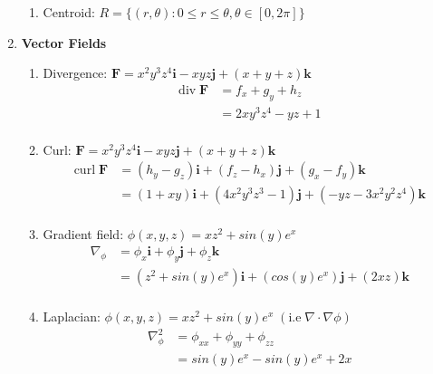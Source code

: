 \documentclass[11pt]{article}
\begin{document}
\begin{preview}
\begin{enumerate}
\begin{enumerate}
            \item Centroid: $R = \{ (r, \theta) : 0 \le r \le \theta, \theta \in [0, 2\pi] \}$
          \end{enumerate}
    \item \textbf{Vector Fields}
          \begin{enumerate}
            \item Divergence: $\textbf{F}=x^{2}y^{3}z^{4}\textbf{i} - xyz\textbf{j} + (x+y+z)\textbf{k}$
                  \begin{align*}
                    \mathrm{div} \; \textbf{F} & = f_{x} + g_{y} + h_{z} \\
                                               & = 2xy^{3}z^{4} -yz + 1  \\
                  \end{align*}
            \item Curl: $\textbf{F}=x^{2}y^{3}z^{4}\textbf{i} - xyz\textbf{j} + (x+y+z)\textbf{k}$
                  \begin{align*}
                    \mathrm{curl} \; \textbf{F} & = (h_y - g_z)\textbf{i} + (f_z - h_x)\textbf{j} + (g_x - f_y)\textbf{k}                      \\
                                                & = (1 + xy)\textbf{i} + (4x^{2}y^{3}z^{3} - 1)\textbf{j} + (-yz - 3x^{2}y^{2}z^{4})\textbf{k} \\
                  \end{align*}
            \item Gradient field: $\phi(x,y,z)=xz^{2}+sin(y)e^{x}$
                  \begin{align*}
                    \nabla_{\phi} & = \phi_{x}\textbf{i} + \phi_{y}\textbf{j} + \phi_{z}\textbf{k}                                                     \\
                                  & =  \left(z^{2} + sin(y)e^{x}\right) \textbf{i} + \left(cos(y)e^{x}\right) \textbf{j} + \left(2xz\right) \textbf{k} \\
                  \end{align*}
            \item Laplacian: $\phi(x,y,z)=xz^{2}+sin(y)e^{x} \; (\mathrm{i.e} \; \nabla{\cdot}\nabla\phi)$
                  \begin{align*}
                    \nabla_{\phi}^{2} & =  \phi_{xx} + \phi_{yy} + \phi_{zz} \\
                                      & =  sin(y)e^{x} - sin(y)e^{x} + 2x    \\

\end{align*}
\end{enumerate}
\end{enumerate}
\end{preview}
\end{document}
